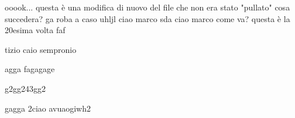 \usepackage{pdfcomment}


    ooook... questa è una modifica di nuovo del file che non era stato "pullato" cosa succedera?
ga    roba a caso 
uhljl
ciao marco sda
ciao marco come va? questa è la 20esima volta 
    faf
    

    tizio caio
    sempronio

    agga
    fagagage


    g2gg243gg2

    gagga
    2ciao avuaogiwh2
